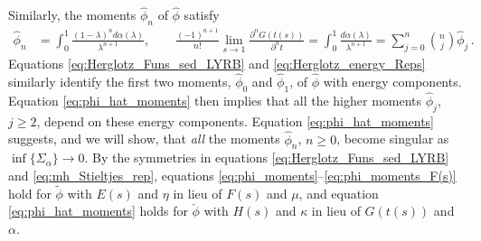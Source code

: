 \documentclass[english,12pt,jmp,graphicx]{revtex4-1}
\newcommand{\ph}{\hat{\phi}}
\begin{document}
Similarly, the moments $\ph_n$ of $\ph$ satisfy
%
\begin{align}\label{eq:phi_hat_moments}
  \ph_n%
      &=\int_0^1\frac{(1-\lambda)^nd\alpha(\lambda)}{\lambda^{n+1}}, \qquad
      \frac{(-1)^{n+1}}{n!}\lim_{s\to1}\frac{\partial^nG(t(s))}{\partial^nt}
         =\int_0^1\frac{d\alpha(\lambda)}{\lambda^{n+1}}
          =\sum_{j=0}^n{n \choose j} \ph_j\,.
\end{align}
%
Equations \eqref{eq:Herglotz_Funs_sed_LYRB} and
\eqref{eq:Herglotz_energy_Reps} similarly identify the first
two moments, $\ph_0$ and $\ph_1$, of $\ph$ with energy
components. Equation \eqref{eq:phi_hat_moments} then implies that all
the higher moments $\ph_j$, $j\geq2$, depend on these energy
components. Equation 
\eqref{eq:phi_hat_moments} suggests, and we will show, that \emph{all}
the moments $\ph_n$, $n\geq0$, become singular as $\inf\{\Sigma_\alpha\}\to0$. By the
symmetries in equations \eqref{eq:Herglotz_Funs_sed_LYRB} and
\eqref{eq:mh_Stieltjes_rep}, equations 
\eqref{eq:phi_moments}--\eqref{eq:phi_moments_F(s)} hold for
$\tilde{\phi}$ with $E(s)$ and $\eta$ in lieu of $F(s)$ and $\mu$, and equation
\eqref{eq:phi_hat_moments} holds for $\check{\phi}$ with $H(s)$ and $\kappa$ in lieu
of $G(t(s))$ and $\alpha$.
\end{document}
